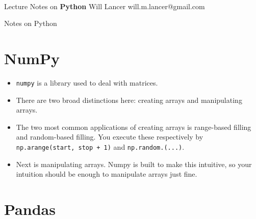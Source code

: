 \documentclass[11pt]{article}
\begin{document}
\thispagestyle{empty}
\bigskip \
\vspace{0.1cm}

\begin{center}
{\fontsize{22}{22} \selectfont Lecture Notes on}
\vskip 16pt
{\fontsize{36}{36} \selectfont \bf \sffamily Python}
\vskip 24pt
{\fontsize{18}{18} \selectfont \rmfamily Will Lancer} 
\vskip 6pt
{\fontsize{14}{14} \selectfont \ttfamily will.m.lancer@gmail.com} 
\vskip 24pt
\end{center}

{\parindent0pt \baselineskip=15.5pt}
\noin
Notes on Python

\newpage
\microtoc
\newpage

\section{NumPy}

\begin{itemize}
    \item \verb|numpy| is a library used to deal with matrices.
    \item There are two broad distinctions here: creating arrays
    and manipulating arrays.
    \item The two most common applications of creating arrays is range-based
    filling and random-based filling. You execute these respectively
    by \verb|np.arange(start, stop + 1)| and \verb|np.random.(...)|.
    \item Next is manipulating arrays. Numpy is built to make this intuitive,
    so your intuition should be enough to manipulate arrays just fine.
\end{itemize}

\section{Pandas}
\end{document}
